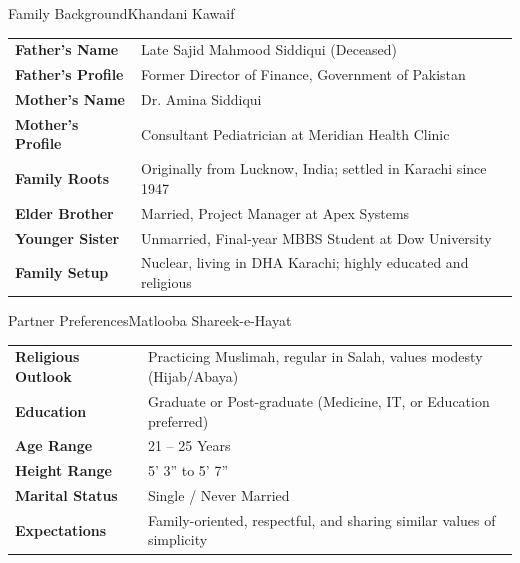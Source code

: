 \documentclass[11pt,a4paper]{article}
\begin{document}
\vspace{0.2cm}

\begin{biodatacard}{\faUsers}{Family Background}{Khandani Kawaif}
  \begin{tabularx}{\linewidth}{>{\bfseries\color{emeraldgreen}\sffamily}l @{\quad:\quad} X}
    Father's Name & Late Sajid Mahmood Siddiqui (Deceased) \\
    Father's Profile & Former Director of Finance, Government of Pakistan \\
    Mother's Name & Dr. Amina Siddiqui \\
    Mother's Profile & Consultant Pediatrician at Meridian Health Clinic \\
    Family Roots & Originally from Lucknow, India; settled in Karachi since 1947 \\
    Elder Brother & Married, Project Manager at Apex Systems \\
    Younger Sister & Unmarried, Final-year MBBS Student at Dow University \\
    Family Setup & Nuclear, living in DHA Karachi; highly educated and religious \\
  \end{tabularx}
\end{biodatacard}

\begin{biodatacard}{\faHeart}{Partner Preferences}{Matlooba Shareek-e-Hayat}
  \begin{tabularx}{\linewidth}{>{\bfseries\color{emeraldgreen}\sffamily}l @{\quad:\quad} X}
    Religious Outlook & Practicing Muslimah, regular in Salah, values modesty (Hijab/Abaya) \\
    Education & Graduate or Post-graduate (Medicine, IT, or Education preferred) \\
    Age Range & 21 -- 25 Years \\
    Height Range & 5' 3'' to 5' 7'' \\
    Marital Status & Single / Never Married \\
    Expectations & Family-oriented, respectful, and sharing similar values of simplicity \\
  \end{tabularx}
\end{biodatacard}
\end{document}

